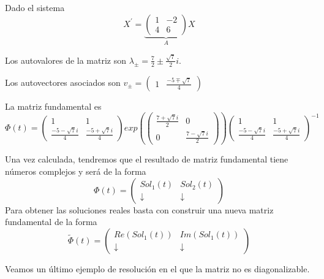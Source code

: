 \documentclass{mathnotes}
\begin{document}
\begin{example}[(Método II)]
Dado el sistema $$X^\prime = \underbrace{\begin{pmatrix}
1 & -2\\ 4 & 6
\end{pmatrix}}_AX$$

Los autovalores de la matriz son $\lambda_\pm = \frac{7}{2} \pm \frac{\sqrt{7}}{2}i$.

Los autovectores asociados son $v_\pm = \begin{pmatrix}
1& \frac{-5\mp\sqrt{7}}{4}
\end{pmatrix}$

La matriz fundamental es 
$$\Phi(t) = \begin{pmatrix}
1 & 1\\ \frac{-5-\sqrt{7}i}{4} & \frac{-5+\sqrt{7}i}{4}
\end{pmatrix}exp(\begin{pmatrix}
\frac{7+\sqrt{7}i}{2} & 0\\ 0 & \frac{7-\sqrt{7}i}{2}
\end{pmatrix})\begin{pmatrix}
1 & 1\\ \frac{-5-\sqrt{7}i}{4} & \frac{-5+\sqrt{7}i}{4}
\end{pmatrix}^{-1}$$

Una vez calculada, tendremos que el resultado de matriz fundamental tiene números complejos y será de la forma $$\Phi(t) = \begin{pmatrix}
Sol_1(t) & Sol_2(t) \\ \downarrow & \downarrow
\end{pmatrix}$$ Para obtener las soluciones reales basta con construir una nueva matriz fundamental de la forma $$\tilde{\Phi}(t) = \begin{pmatrix}
Re(Sol_1(t)) & Im(Sol_1(t))\\ \downarrow & \downarrow
\end{pmatrix}$$
\end{example}

Veamos un último ejemplo de resolución en el que la matriz no es diagonalizable.
\end{document}
